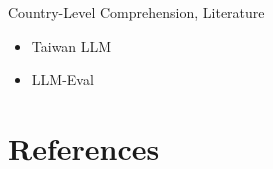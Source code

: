\documentclass[12pt]{beamer}
\begin{document}
\begin{frame}{Country-Level Comprehension, Literature}
\begin{itemize}
    \item Taiwan LLM
    \item LLM-Eval
\end{itemize}
\end{frame}


\section{References}


\begin{frame}[allowframebreaks]{}
\renewcommand{\section}[2]{}%

\end{frame}
\end{document}
